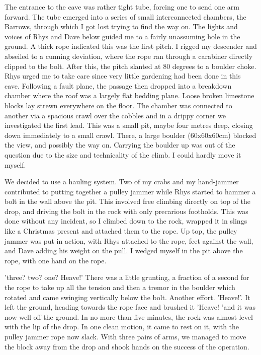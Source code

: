 \documentclass[onecolumn]{book}
\begin{document}
The entrance to the cave was rather tight tube, forcing one to send one arm forward. The tube emerged into a series of small interconnected chambers, the Barrows, through which I got lost trying to find the way on. The lights and voices of Rhys and Dave below guided me to a fairly unassuming hole in the ground. A thick rope indicated this was the first pitch. I rigged my descender and abseiled to a cunning deviation, where the rope ran through a carabiner directly clipped to the bolt. After this, the pitch slanted at 80 degrees to a boulder choke. Rhys urged me to take care since very little gardening had been done in this cave. Following a fault plane, the passage then dropped into a breakdown chamber where the roof was a largely flat bedding plane. Loose broken limestone blocks lay strewn everywhere on the floor. The chamber was connected to another via a spacious crawl over the cobbles and in a drippy corner we investigated the first lead. This was a small pit, maybe four metres deep, closing down immediately to a small crawl. There, a large boulder (60x60x60cm) blocked the view, and possibly the way on. Carrying the boulder up was out of the question due to the size and technicality of the climb. I could hardly move it myself. 

We decided to use a hauling system. Two of my crabs and my hand-jammer contributed to putting together a pulley jammer while Rhys started to hammer a bolt in the wall above the pit. This involved free climbing directly on top of the drop, and driving the bolt in the rock with only precarious footholds. This was done without any incident, so I climbed down to the rock, wrapped it in slings like a Christmas present and attached them to the rope. Up top, the pulley jammer was put in action, with Rhys attached to the rope, feet against the wall, and Dave adding his weight on the pull. I wedged myself in the pit above the rope, with one hand on the rope. 

'three? two? one? Heave!' There was a little grunting, a fraction of a second  for the rope to take up all the tension and then a tremor in the boulder which rotated and came swinging vertically below the bolt. Another effort. 'Heave!'. It left the ground, heading towards the rope face and brushed it 'Heave! 'and it was now well off the ground. In no more than five minutes, the rock was almost level with the lip of the drop. In one clean motion, it came to rest on it, with the pulley jammer rope now slack. With three pairs of arms, we managed to move the block away from the drop and shook hands on the success of the operation. 
\end{document}
